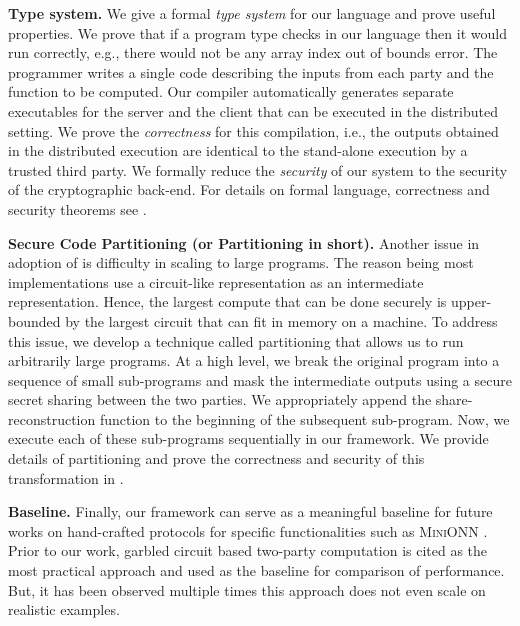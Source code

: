 \textbf{Type system.} We give a formal {\em type system} for our language and prove useful properties. We prove that if a program type checks in our language then it would run correctly, e.g., there would not be any array index out of bounds error. The programmer writes a single code describing the inputs from each party and the function to be computed. Our compiler automatically generates separate executables for the server and the client that can be executed in the distributed setting. We prove the {\em correctness} for this compilation, i.e., the outputs obtained in the distributed execution are identical to the stand-alone execution by a trusted third party. We formally reduce the {\em security} of our system to the security of the cryptographic back-end. For details on formal language, correctness and security theorems see .


\textbf{Secure Code Partitioning (or Partitioning in short).} Another issue in adoption of \mpc is difficulty in scaling to large programs. 
The reason being most \mpc implementations use a circuit-like representation as an intermediate representation. Hence, the largest compute that can be done securely is upper-bounded by the largest circuit that can fit in memory on a machine. 
To address this issue, we develop a technique called partitioning that allows us to run arbitrarily large programs. At a high level, we break the original program into a sequence of small sub-programs and mask the intermediate outputs using a secure secret sharing between the two parties. We appropriately append the share-reconstruction function to the beginning of the subsequent sub-program. Now, we execute each of these sub-programs sequentially in our framework. We provide details of partitioning and prove the correctness and security of this transformation in .

\textbf{Baseline.} Finally, our framework \tool can serve as a meaningful baseline for future works on hand-crafted \mpc protocols for specific functionalities such as \textsc{MiniONN} \cite{minionn}. 
Prior to our work, garbled circuit based two-party computation is cited as the most practical approach and used as the baseline for comparison of performance. But, it has been observed multiple times this approach does not even scale on realistic examples.



